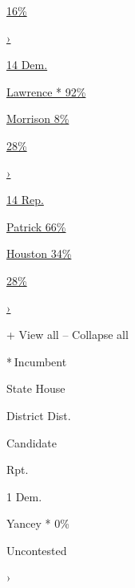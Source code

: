 \href{https://www.nytimes.com/interactive/2020/08/04/us/elections/results-michigan-house-district-13-primary-election.html}{16\%}

\href{https://www.nytimes.com/interactive/2020/08/04/us/elections/results-michigan-house-district-13-primary-election.html}{›}

\href{https://www.nytimes.com/interactive/2020/08/04/us/elections/results-michigan-house-district-14-primary-election.html}{14
Dem.}

\href{https://www.nytimes.com/interactive/2020/08/04/us/elections/results-michigan-house-district-14-primary-election.html}{
Lawrence * 92\% }

\href{https://www.nytimes.com/interactive/2020/08/04/us/elections/results-michigan-house-district-14-primary-election.html}{
Morrison 8\% }

\href{https://www.nytimes.com/interactive/2020/08/04/us/elections/results-michigan-house-district-14-primary-election.html}{28\%}

\href{https://www.nytimes.com/interactive/2020/08/04/us/elections/results-michigan-house-district-14-primary-election.html}{›}

\href{https://www.nytimes.com/interactive/2020/08/04/us/elections/results-michigan-house-district-14-primary-election.html}{14
Rep.}

\href{https://www.nytimes.com/interactive/2020/08/04/us/elections/results-michigan-house-district-14-primary-election.html}{
Patrick 66\% }

\href{https://www.nytimes.com/interactive/2020/08/04/us/elections/results-michigan-house-district-14-primary-election.html}{
Houston 34\% }

\href{https://www.nytimes.com/interactive/2020/08/04/us/elections/results-michigan-house-district-14-primary-election.html}{28\%}

\href{https://www.nytimes.com/interactive/2020/08/04/us/elections/results-michigan-house-district-14-primary-election.html}{›}

+ View all -- Collapse all

* Incumbent~

State House

District Dist.

Candidate

Rpt.

1 Dem.

 Yancey * 0\%

Uncontested

›

